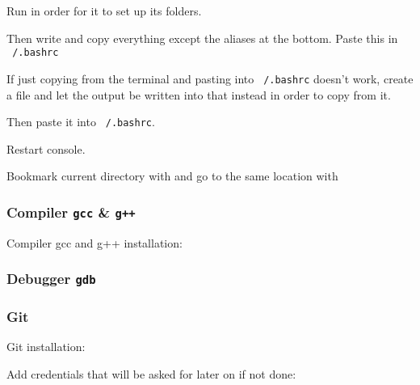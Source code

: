 Run  in order for it to set up its folders.

Then write  and copy everything except the aliases at the bottom. Paste this in \texttt{~/.bashrc}

If just copying from the terminal and pasting into \texttt{~/.bashrc} doesn't work, create a file and let the output be written into that instead in order to copy from it.



Then paste it into \texttt{~/.bashrc}.

Restart console.

Bookmark current directory with  and go to the same location with 

\subsubsection{Compiler \texttt{gcc} \& \texttt{g++}}
Compiler gcc and g++ installation:


\subsubsection{Debugger \texttt{gdb}}


\subsubsection{Git}
Git installation:


Add credentials that will be asked for later on if not done:


